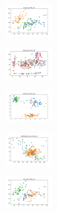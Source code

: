 \begin{figure}[H]
\begin{subfigure}
    \end{subfigure}
    \hfill
    \begin{subfigure}
        \centering
        \includegraphics[width=0.234\textwidth]{img/agesf/iris_set_const_10_589741062_clust.png}
    \end{subfigure}
    \hfill
    \begin{subfigure}
        \centering
        \includegraphics[width=0.234\textwidth]{img/agesf/ecoli_set_const_10_589741062_clust.png}
    \end{subfigure}
    \hfill
    \begin{subfigure}
        \centering
        \includegraphics[width=0.234\textwidth]{img/agesf/rand_set_const_10_589741062_clust.png}
    \end{subfigure}
    \hfill
    \begin{subfigure}
        \centering
        \includegraphics[width=0.234\textwidth]{img/agesf/newthyroid_set_const_10_589741062_clust.png}
    \end{subfigure}
    \hfill
    \begin{subfigure}
        \centering
        \includegraphics[width=0.234\textwidth]{img/agesf/iris_set_const_10_277451237_clust.png}
    \end{subfigure}
    \hfill

\end{figure}
